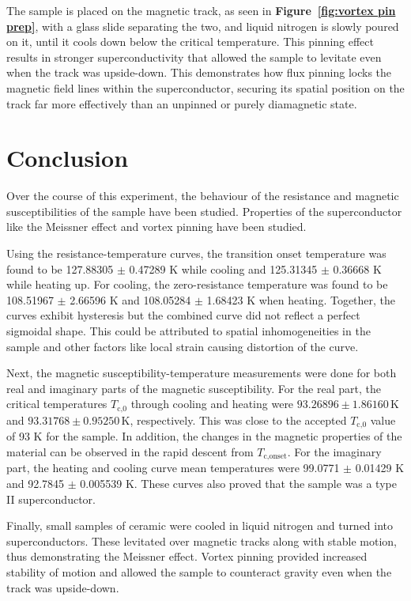 \documentclass[a4paper,11pt]{article}
\numberwithin{equation}{section}
\begin{document}
The sample is placed on the magnetic track, as seen in \textbf{Figure~\ref{fig:vortex pin prep}}, with a glass slide separating the two, and liquid nitrogen is slowly poured on it, until it cools down below the critical temperature. This pinning effect results in stronger superconductivity that allowed the sample to levitate even when the track was upside-down. This demonstrates how flux pinning locks the magnetic field lines within the superconductor, securing its spatial position on the track far more effectively than an unpinned or purely diamagnetic state.

\section[Conclusion]{Conclusion\protect}
Over the course of this experiment, the behaviour of the resistance and magnetic susceptibilities of the  sample have been studied. Properties of the superconductor like the Meissner effect and vortex pinning have been studied. 

\smallskip
Using the resistance-temperature curves, the transition onset temperature was found to be 127.88305 $\pm$ 0.47289 K while cooling and 125.31345 $\pm$ 0.36668 K while heating up. For cooling, the zero-resistance temperature was found to be 108.51967 $\pm$ 2.66596 K and 108.05284 $\pm$ 1.68423 K when heating.  Together, the curves exhibit hysteresis but the combined curve did not reflect a perfect sigmoidal shape. This could be attributed to spatial inhomogeneities in the sample and other factors like local strain causing distortion of the curve.

\smallskip
Next, the magnetic susceptibility-temperature measurements were done for both real and imaginary parts of the magnetic susceptibility. For the real part, the critical temperatures $T_{\text{c,0}}$ through cooling and heating were $93.26896 \pm 1.86160 \,$K and $93.31768 \pm 0.95250 \,$K, respectively. This was close to the accepted $T_{\text{c,0}}$ value of 93 K for the  sample. In addition, the changes in the magnetic properties of the material can be observed in the rapid descent from $T_{\text{c,onset}}$.  For the imaginary part, the heating and cooling curve mean temperatures were 99.0771 $\pm$ 0.01429 K and 92.7845 $\pm$ 0.005539 K. These curves also proved that the sample was a type II superconductor. 

\smallskip
Finally, small samples of ceramic were cooled in liquid nitrogen and turned into superconductors. These levitated over magnetic tracks along with stable motion, thus demonstrating the Meissner effect. Vortex pinning provided increased stability of motion and allowed the sample to counteract gravity even when the track was upside-down.
\newpage
{}


\nocite{ai_note}
\end{document}
